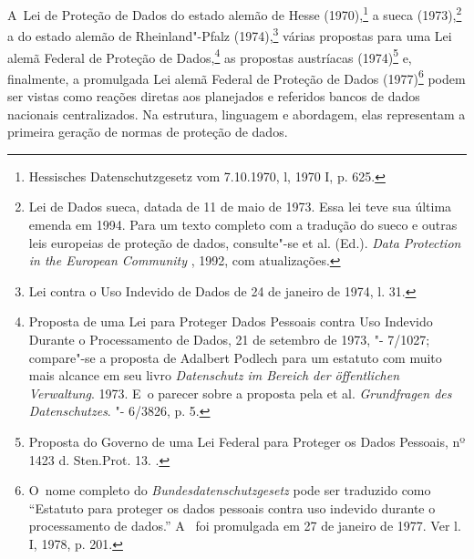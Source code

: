 A~Lei de Proteção de Dados do estado alemão de Hesse (1970),\footnote{Hessisches
  Datenschutzgesetz vom 7.10.1970, l, 1970 I, p. 625.} a sueca
(1973),\footnote{Lei de Dados sueca, datada de 11 de maio de 1973. Essa
  lei teve sua última emenda em 1994. Para um texto completo com a
  tradução do sueco e outras leis europeias de proteção de dados,
  consulte"-se  et al. (Ed.). \emph{Data Protection in the
  European Community} , 1992, com atualizações.} a do estado alemão de
Rheinland"-Pfalz (1974),\footnote{Lei contra o Uso Indevido de Dados de
  24 de janeiro de 1974, l. 31.} várias propostas para uma Lei alemã
Federal de Proteção de Dados,\footnote{Proposta de uma Lei para Proteger
  Dados Pessoais contra Uso Indevido Durante o Processamento de Dados,
  21 de setembro de 1973, "- 7/1027; compare"-se a proposta de
  Adalbert Podlech para um estatuto com muito mais alcance em seu livro
  \emph{Datenschutz im Bereich der öffentlichen Verwaltung}. 1973. E~o
  parecer sobre a proposta pela  et al. \emph{Grundfragen des
  Datenschutzes}. "- 6/3826, p. 5.} as propostas austríacas
(1974)\footnote{Proposta do Governo de uma Lei Federal para Proteger os
  Dados Pessoais, nº 1423 d. Sten.Prot. 13.  .} e, finalmente, a
promulgada Lei alemã Federal de Proteção de Dados (1977)\footnote{O~nome
  completo do \emph{Bundesdatenschutzgesetz} pode ser traduzido como
  ``Estatuto para proteger os dados pessoais contra uso indevido durante
  o processamento de dados.'' A~ foi promulgada em 27 de janeiro de
  1977. Ver l. I, 1978, p. 201.} podem ser vistas como reações
diretas aos planejados e referidos bancos de dados nacionais
centralizados. Na estrutura, linguagem e abordagem, elas representam a
primeira geração de normas de proteção de dados.

